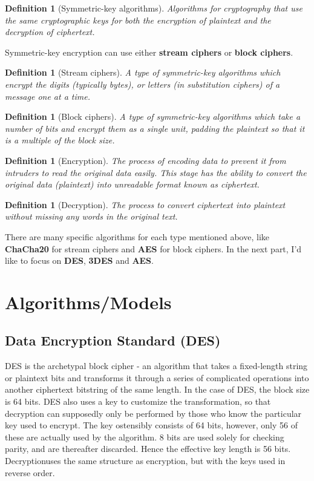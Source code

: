 \documentclass[11pt]{article}
\newtheorem{definition}[theorem]{Definition}
\begin{document}
\begin{definition}
[Symmetric-key algorithms]
Algorithms for cryptography that use the same cryptographic keys for both the encryption of plaintext and the decryption of ciphertext.
\end{definition}

Symmetric-key encryption can use either \textbf{stream ciphers} or \textbf{block ciphers}.

\begin{definition}
[Stream ciphers]
A type of symmetric-key algorithms which encrypt the digits (typically bytes), or letters (in substitution ciphers) of a message one at a time.
\end{definition}

\begin{definition}
[Block ciphers]
A type of symmetric-key algorithms which take a number of bits and encrypt them as a single unit, padding the plaintext so that it is a multiple of the block size.
\end{definition}

\begin{definition}
[Encryption]
The process of encoding data to prevent it from intruders to read the original data easily. This stage has the ability to convert the original data (plaintext) into unreadable format known as ciphertext.
\end{definition}

\begin{definition}
[Decryption]
The process to convert ciphertext into plaintext without missing any words in the original text.
\end{definition}

There are many specific algorithms for each type mentioned above, like \textbf{ChaCha20} for stream ciphers and \textbf{AES} for block ciphers. In the next part, I'd like to focus on \textbf{DES}, \textbf{3DES} and \textbf{AES}.

\section{Algorithms/Models}

\subsection{Data Encryption Standard (DES)}
DES is the archetypal block cipher - an algorithm that takes a fixed-length string or plaintext bits and transforms it through a series of complicated operations into another ciphertext bitstring of the same length. In the case of DES, the block size is 64 bits. DES also uses a key to customize the transformation, so that decryption can supposedly only be performed by those who know the particular key used to encrypt. The key ostensibly consists of 64 bits, however, only 56 of these are actually used by the algorithm. 8 bits are used solely for checking parity, and are thereafter discarded. Hence the effective key length is 56 bits. Decryptionuses the same structure as encryption, but with the keys used in reverse order.
\end{document}
